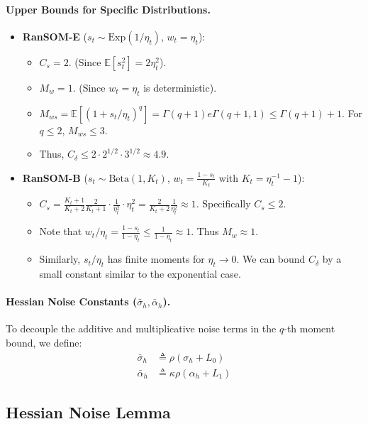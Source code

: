 \documentclass{article}
\theoremstyle{plain}
\theoremstyle{definition}
\theoremstyle{remark}
\begin{document}
\paragraph{Upper Bounds for Specific Distributions.}
\begin{itemize}
    \item \textbf{RanSOM-E} ($s_t \sim \text{Exp}(1/\eta_t)$, $w_t = \eta_t$):
    \begin{itemize}
        \item $C_s = 2$. (Since $\mathbb{E}[s_t^2] = 2\eta_t^2$).
        \item $M_w = 1$. (Since $w_t = \eta_t$ is deterministic).
        \item $M_{ws} = \mathbb{E}[(1 + s_t/\eta_t)^q] = \Gamma(q+1) e \Gamma(q+1, 1) \le \Gamma(q+1) + 1$. For $q \le 2$, $M_{ws} \le 3$.
        \item Thus, $C_\delta \le 2 \cdot 2^{1/2} \cdot 3^{1/2} \approx 4.9$.
    \end{itemize}
    \item \textbf{RanSOM-B} ($s_t \sim \text{Beta}(1, K_t)$, $w_t = \frac{1-s_t}{K_t}$ with $K_t = \eta_t^{-1} - 1$):
    \begin{itemize}
        \item $C_s = \frac{K_t+1}{K_t+2} \frac{2}{K_t+1} \cdot \frac{1}{\eta_t^2} \cdot \eta_t^2 = \frac{2}{K_t+2} \frac{1}{\eta_t^2} \approx 1$. Specifically $C_s \le 2$.
        \item Note that $w_t/\eta_t = \frac{1-s_t}{1-\eta_t} \le \frac{1}{1-\eta_t} \approx 1$. Thus $M_w \approx 1$.
        \item Similarly, $s_t/\eta_t$ has finite moments for $\eta_t \to 0$. We can bound $C_\delta$ by a small constant similar to the exponential case.
    \end{itemize}
\end{itemize}

\paragraph{Hessian Noise Constants ($\bar{\sigma}_h, \bar{\alpha}_h$).}
To decouple the additive and multiplicative noise terms in the $q$-th moment bound, we define:
\begin{align}
    \bar{\sigma}_h &\triangleq \rho (\sigma_h + L_0) \\
    \bar{\alpha}_h &\triangleq \kappa \rho (\alpha_h + L_1)
\end{align}

\subsection{Hessian Noise Lemma}
\end{document}
